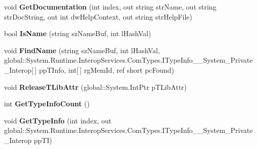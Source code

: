 \begin{DoxyCompactItemize}
void {\bfseries Get\+Documentation} (int index, out string str\+Name, out string str\+Doc\+String, out int dw\+Help\+Context, out string str\+Help\+File)
\item 
\mbox{\label{interface_system_1_1_runtime_1_1_interop_services_1_1_com_types_1_1_i_type_lib_____system___private___interop_a3dbf23af652bedf5fa2f224e41e467d9}} 
bool {\bfseries Is\+Name} (string sz\+Name\+Buf, int l\+Hash\+Val)
\item 
\mbox{\label{interface_system_1_1_runtime_1_1_interop_services_1_1_com_types_1_1_i_type_lib_____system___private___interop_a8b02e80b39806b510da13271024c7b50}} 
void {\bfseries Find\+Name} (string sz\+Name\+Buf, int l\+Hash\+Val, global\+::\+System.\+Runtime.\+Interop\+Services.\+Com\+Types.\+I\+Type\+Info\+\_\+\+\_\+\+System\+\_\+\+Private\+\_\+\+Interop\mbox{[}$\,$\mbox{]} pp\+T\+Info, int\mbox{[}$\,$\mbox{]} rg\+Mem\+Id, ref short pc\+Found)
\item 
\mbox{\label{interface_system_1_1_runtime_1_1_interop_services_1_1_com_types_1_1_i_type_lib_____system___private___interop_a35bcf4ef9e11f232d8be78df4d98603f}} 
void {\bfseries Release\+T\+Lib\+Attr} (global\+::\+System.\+Int\+Ptr p\+T\+Lib\+Attr)
\item 
\mbox{\label{interface_system_1_1_runtime_1_1_interop_services_1_1_com_types_1_1_i_type_lib_____system___private___interop_a2698e0279128bfafc4c5f48be7a1e066}} 
int {\bfseries Get\+Type\+Info\+Count} ()
\item 
\mbox{\label{interface_system_1_1_runtime_1_1_interop_services_1_1_com_types_1_1_i_type_lib_____system___private___interop_a294102830607259f08459d9bd9c31d4e}} 
void {\bfseries Get\+Type\+Info} (int index, out global\+::\+System.\+Runtime.\+Interop\+Services.\+Com\+Types.\+I\+Type\+Info\+\_\+\+\_\+\+System\+\_\+\+Private\+\_\+\+Interop pp\+TI)

\end{DoxyCompactItemize}
